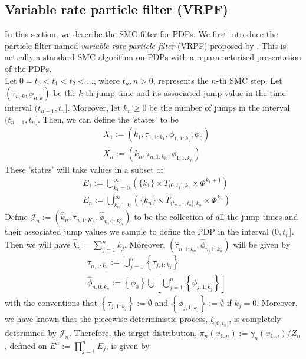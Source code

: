 \documentclass[12pt,a4paper]{article}
\begin{document}
\subsection{Variable rate particle filter (VRPF)}
In this section, we describe the SMC filter for PDPs. We first introduce the particle filter named \textit{variable rate particle filter} (VRPF) proposed by \cite{godsill2005variable}. This is actually a standard SMC algorithm on PDPs with a reparameterised presentation of the PDPs.\\
Let $0=t_0 < t_1 < t_2 <... $, where $t_n, n>0$, represents the $n$-th SMC step. Let $\left(\tau_{n,k},\phi_{n,k}\right)$ be the $k$-th jump time and its associated jump value in the time interval $(t_{n-1},t_n]$. Moreover, let $k_n \geq 0$ be the number of jumps in the interval $(t_{n-1},t_n]$. Then, we can define the 'states' to be 
\begin{subequations}
\begin{align}
\label{def:VRPF_States}
    &X_1 := \left(k_1,\tau_{1,1:k_1},\phi_{1,1:k_1},\phi_0\right) \\
    &X_n := \left(k_n,\tau_{n,1:k_n},\phi_{1,1:k_n}\right)
\end{align}
\end{subequations}
These 'states' will take values in a subset of
\begin{subequations}
\begin{align}
    &E_1 := \bigcup_{k_1=0}^{\infty} \left(\{k_1\}\times T_{(0,t_1],k_1} \times \Phi^{k_1+1}\right)\label{VRPF Support 1}\\
    &E_n := \bigcup_{k_n=0}^{\infty} \left(\{k_n\} \times T_{(t_{n-1},t_n],k_n} \times \Phi^{k_n} \right)\label{def:VRPF Support 2}
\end{align}
\end{subequations}
Define $\mathcal{J}_n := \left(\hat{k}_n,\hat{\tau}_{n,1:K_n},\hat{\phi}_{n,0:K_n}\right)$ to be the collection of all the jump times and their associated jump values we sample to define the PDP in the interval $(0,t_n]$. Then we will have $\hat{k}_n = \sum_{j=1}^{n} k_j$. Moreover, $\left(\hat{\tau}_{n,1:\hat{k}_n},\hat{\phi}_{n,1:\hat{k}_n}\right)$ will be given by
\begin{subequations}
\begin{align}
    & \hat{\tau}_{n,1:\hat{k}_n} := \bigcup_{j=1}^{n} \left\{\tau_{j,1:k_j}\right\} \label{def:VRPF_Path_tau}\\
    & \hat{\phi}_{n,0:\hat{k}_n} := \left\{\phi_0\right\}\bigcup\left[\bigcup_{j=1}^{n} \left\{\phi_{j,1:k_j}\right\}\right] \label{def:VRPF_Path_phi}
\end{align}
\end{subequations}
with the conventions that $\left\{\tau_{j,1:k_j}\right\} := \emptyset$ and $\left\{\phi_{j,1:k_j}\right\} := \emptyset$ if $k_j = 0$. Moreover, we have known that the piecewise deterministic process, $\zeta_{(0,t_n]}$, is completely determined by $\mathcal{J}_n$. Therefore, the target distribution, $\pi_n(x_{1:n}) := \gamma_n(x_{1:n})/Z_n$, defined on $E^n := \prod_{j=1}^n E_j$, is given by
\end{document}
